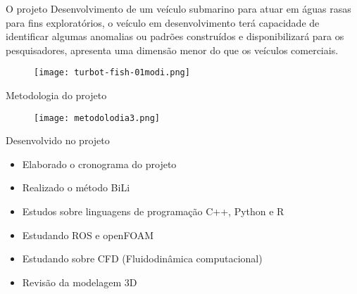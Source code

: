 
\begin{frame}[c]{O projeto}
    Desenvolvimento de um veículo submarino para atuar em águas rasas para fins exploratórios,
    o veículo em desenvolvimento terá capacidade de identificar algumas anomalias ou padrões construídos
    e disponibilizará para os pesquisadores, apresenta uma dimensão menor do que os veículos comerciais.
    \begin{figure}
        \texttt{[image: turbot-fish-01modi.png]}
    \end{figure}
    
\end{frame}
\begin{frame}[c]{Metodologia do projeto }
        \begin{figure}
        \texttt{[image: metodolodia3.png]}
    \end{figure}
\end{frame}
\begin{frame}[t]{Desenvolvido no projeto}
    \begin{itemize}
        \item Elaborado o cronograma do projeto
        \item Realizado o método BiLi
        \item Estudos sobre linguagens de programação C++, Python e R
        \item Estudando ROS e openFOAM
        \item Estudando sobre CFD (Fluidodinâmica computacional)
        \item Revisão da modelagem 3D 
    \end{itemize}    
\end{frame}
